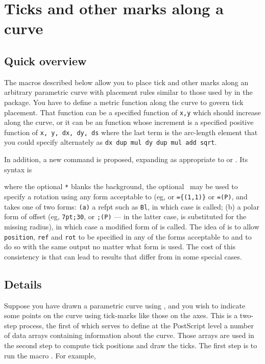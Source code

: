 \documentclass[11pt,english,BCOR=10mm,DIV=12,bibliography=totoc,parskip=false,headings=small,
    headinclude=false,footinclude=false,oneside]{pst-doc}
\begin{document}
\section{Ticks and other marks along a curve}
\subsection{Quick overview}

The macros described below allow you to place tick and other marks along an arbitrary 
parametric curve with placement rules similar to those used by  in 
the  package. You have to define a metric function along the curve to 
govern tick placement. That function can be a specified function of \texttt{x,y} which 
should increase along the curve, or it can be an function whose increment is a specified 
positive function of \texttt{x, y, dx, dy, ds} where the last term is the arc-length element 
that you could specify alternately as \texttt{dx dup mul dy dup mul add sqrt}.


In addition, a new command  is proposed, expanding as appropriate to  or . Its syntax is

\begin{BDef}
\OptArgs{}
\end{BDef}

where the optional \texttt{*} blanks the background, the optional \OptArgs\ may be used to specify a rotation 
using any form acceptable to  (eg,  or \verb|={(1,1)}| 
or \verb|=(P)|, and  takes one of 
two forms: \verb=(a)= a refpt such as \texttt{Bl}, in which case  is called; (b) a polar form of offset 
(eg, \verb=7pt;30=, or \verb=;(P)= --- in the latter case,  is substituted for the missing 
radius), in which case a modified form of  is called. The idea of  is to allow  \texttt{position}, 
\texttt{ref} and \texttt{rot} to be specified in any of the forms acceptable to  and to do so with 
the same output no matter what form is used. The cost of this consistency is that  can lead to results 
that differ from  in some special cases. 


\subsection{Details}
Suppose you have drawn a parametric curve using , and you wish to 
indicate some points on the curve using tick-marks like those  on the axes. This is a 
two-step process, the first of which serves to define at the PostScript level a 
number of data arrays containing information about the curve. Those arrays are used 
in the second step to compute tick positions and draw the ticks. The first step is 
to run the macro . For example,
\end{document}
